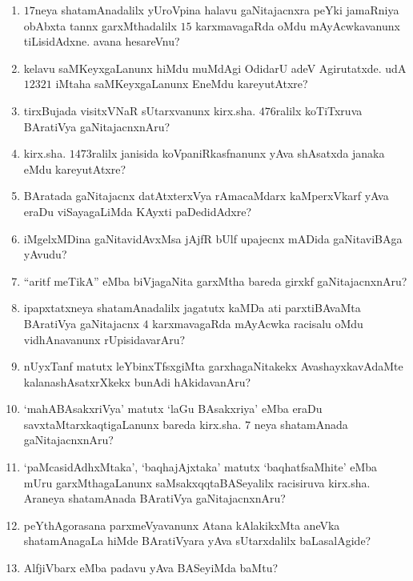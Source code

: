 \begin{enumerate}
\item $17$neya shatamAnadalilx yUroVpina halavu gaNitajacnxra peYki  jamaRniya obAbxta tannx garxMthadalilx $15$ karxmavagaRda oMdu mAyAcwkavanunx tiLisidAdxne. avana hesareVnu?
  
\item kelavu saMKeyxgaLanunx hiMdu muMdAgi OdidarU adeV Agirutatxde. udA $12321$ iMtaha saMKeyxgaLanunx EneMdu kareyutAtxre?
  
\item tirxBujada visitxVNaR sUtarxvanunx  kirx.sha. $476$ralilx koTiTxruva BAratiVya gaNitajacnxnAru?
  
\item kirx.sha. $1473$ralilx janisida koVpaniRkasfnanunx yAva shAsatxda janaka eMdu kareyutAtxre?
  
\item BAratada gaNitajacnx datAtxterxVya rAmacaMdarx kaMperxVkarf yAva eraDu viSayagaLiMda KAyxti paDedidAdxre? 
  
\item iMgelxMDina gaNitavidAvxMsa jAjfR bUlf upajecnx mADida gaNitaviBAga yAvudu?
  
\item ``aritf meTikA'' eMba biVjagaNita garxMtha bareda girxkf gaNitajacnxnAru?

\item ipapxtatxneya shatamAnadalilx jagatutx kaMDa ati parxtiBAvaMta BAratiVya gaNitajacnx $4$ karxmavagaRda mAyAcwka racisalu oMdu vidhAnavanunx rUpisidavarAru?
  
\item nUyxTanf matutx leYbinxTfsxgiMta garxhagaNitakekx AvashayxkavAdaMte kalanashAsatxrXkekx bunAdi hAkidavanAru?
  
\item `mahABAsakxriVya' matutx `laGu BAsakxriya' eMba eraDu savxtaMtarxkaqti\-gaLanunx bareda kirx.sha. $7$ neya shatamAnada gaNitajacnxnAru?
  
\item `paMcasidAdhxMtaka', `baqhajAjxtaka' matutx `baqhatfsaMhite' eMba mUru garxMthagaLanunx saMsakxqqtaBASeyalilx racisiruva kirx.sha. Araneya shatamAnada BAratiVya gaNitajacnxnAru?
  
\item peYthAgorasana parxmeVyavanunx Atana kAlakikxMta aneVka shatamAnagaLa hiMde BAratiVyara yAva sUtarxdalilx baLasalAgide?
  
\item AlfjiVbarx eMba padavu yAva BASeyiMda baMtu?
  

\end{enumerate}
